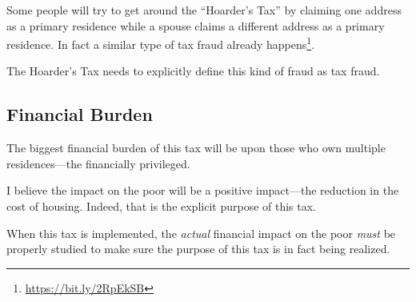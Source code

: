 Some people will try to get around the ``Hoarder's Tax'' by claiming one address as a primary residence while a spouse claims a different address as a primary residence. In fact a similar type of tax fraud already happens\footnote{\url{https://bit.ly/2RpEkSB}}.

The Hoarder's Tax needs to explicitly define this kind of fraud as tax fraud.

\subsection{Financial Burden}

The biggest financial burden of this tax will be upon those who own multiple residences---the financially privileged.

I believe the impact on the poor will be a positive impact---the reduction in the cost of housing. Indeed, that is the explicit purpose of this tax.

When this tax is implemented, the \emph{actual} financial impact on the poor \emph{must} be properly studied to make sure the purpose of this tax is in fact being realized.
